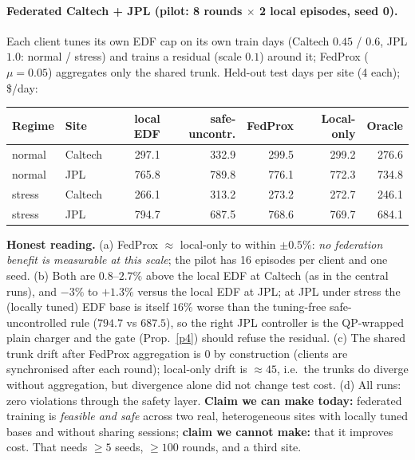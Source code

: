 \paragraph{Federated Caltech + JPL (pilot: 8 rounds $\times$ 2 local episodes, seed 0).} Each client tunes its own EDF cap on its own train days
(Caltech $0.45$ / $0.6$, JPL $1.0$: normal / stress) and trains a residual (scale $0.1$) around it; FedProx ($\mu=0.05$) aggregates only the shared trunk.
Held-out test days per site (4 each); \$/day:
\begin{center}\small\begin{tabular}{@{}llrrrrr@{}}
\toprule Regime & Site & local EDF & safe-uncontr. & FedProx & Local-only & Oracle\\\midrule
normal & Caltech & 297.1 & 332.9 & 299.5 & 299.2 & 276.6\\
normal & JPL & 765.8 & 789.8 & 776.1 & 772.3 & 734.8\\
stress & Caltech & 266.1 & 313.2 & 273.2 & 272.7 & 246.1\\
stress & JPL & 794.7 & 687.5 & 768.6 & 769.7 & 684.1\\
\bottomrule\end{tabular}\end{center}
\noindent\textbf{Honest reading.} (a) FedProx $\approx$ local-only to within $\pm0.5\%$: \emph{no federation benefit is measurable at this scale}; the
pilot has 16 episodes per client and one seed. (b) Both are $0.8$--$2.7\%$ above the local EDF at Caltech (as in the central runs), and $-3\%$ to $+1.3\%$
versus the local EDF at JPL; at JPL under stress the (locally tuned) EDF base is itself $16\%$ worse than the tuning-free safe-uncontrolled rule ($794.7$ vs $687.5$), so the right
JPL controller is the QP-wrapped plain charger and the gate (Prop.~\ref{p4}) should refuse the residual. (c) The shared trunk drift after FedProx aggregation is $0$ by
construction (clients are synchronised after each round); local-only drift is $\approx45$, i.e.\ the trunks do diverge without aggregation, but divergence alone did not change test cost.
(d) All runs: zero violations through the safety layer. \textbf{Claim we can make today:} federated training is \emph{feasible and safe} across two real,
heterogeneous sites with locally tuned bases and without sharing sessions; \textbf{claim we cannot make:} that it improves cost. That needs $\ge5$ seeds, $\ge100$ rounds, and
a third site.

